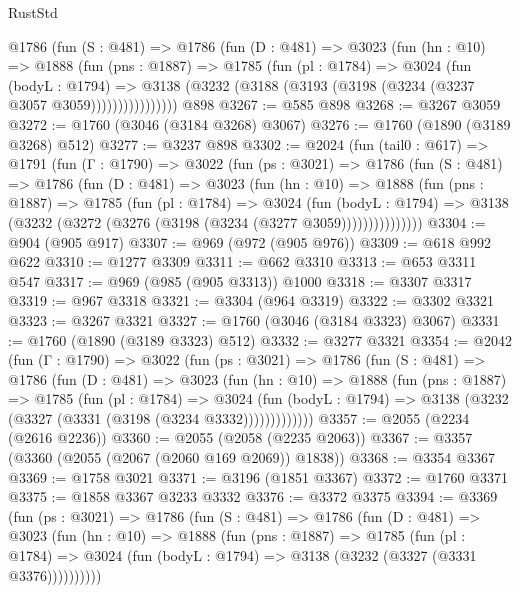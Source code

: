 \begin{lexlean}{RustStd}
\begin{coremodule}
          @1786
            (fun (S : @481) =>
            @1786
              (fun (D : @481) =>
              @3023
                (fun (hn : @10) =>
                @1888
                  (fun (pns : @1887) =>
                  @1785
                    (fun (pl : @1784) =>
                    @3024
                      (fun (bodyL : @1794) =>
                      @3138 (@3232 (@3188 (@3193 (@3198 (@3234 (@3237 @3057 @3059))))))))))))))))
    @898
@3267 := @585 @898
@3268 := @3267 @3059
@3272 := @1760 (@3046 (@3184 @3268) @3067)
@3276 := @1760 (@1890 (@3189 @3268) @512)
@3277 := @3237 @898
@3302 := @2024
    (fun (tail0 : @617) =>
    @1791
      (fun (Γ : @1790) =>
      @3022
        (fun (ps : @3021) =>
        @1786
          (fun (S : @481) =>
          @1786
            (fun (D : @481) =>
            @3023
              (fun (hn : @10) =>
              @1888
                (fun (pns : @1887) =>
                @1785
                  (fun (pl : @1784) =>
                  @3024
                    (fun (bodyL : @1794) =>
                    @3138 (@3232 (@3272 (@3276 (@3198 (@3234 (@3277 @3059)))))))))))))))
@3304 := @904 (@905 @917)
@3307 := @969 (@972 (@905 @976))
@3309 := @618 @992 @622
@3310 := @1277 @3309
@3311 := @662 @3310
@3313 := @653 @3311 @547
@3317 := @969 (@985 (@905 @3313)) @1000
@3318 := @3307 @3317
@3319 := @967 @3318
@3321 := @3304 (@964 @3319)
@3322 := @3302 @3321
@3323 := @3267 @3321
@3327 := @1760 (@3046 (@3184 @3323) @3067)
@3331 := @1760 (@1890 (@3189 @3323) @512)
@3332 := @3277 @3321
@3354 := @2042
    (fun (Γ : @1790) =>
    @3022
      (fun (ps : @3021) =>
      @1786
        (fun (S : @481) =>
        @1786
          (fun (D : @481) =>
          @3023
            (fun (hn : @10) =>
            @1888
              (fun (pns : @1887) =>
              @1785
                (fun (pl : @1784) =>
                @3024
                  (fun (bodyL : @1794) =>
                  @3138 (@3232 (@3327 (@3331 (@3198 (@3234 @3332)))))))))))))
@3357 := @2055 (@2234 (@2616 @2236))
@3360 := @2055 (@2058 (@2235 @2063))
@3367 := @3357 (@3360 (@2055 (@2067 (@2060 @169 @2069)) @1838))
@3368 := @3354 @3367
@3369 := @1758 @3021
@3371 := @3196 (@1851 @3367)
@3372 := @1760 @3371
@3375 := @1858 @3367 @3233 @3332
@3376 := @3372 @3375
@3394 := @3369
    (fun (ps : @3021) =>
    @1786
      (fun (S : @481) =>
      @1786
        (fun (D : @481) =>
        @3023
          (fun (hn : @10) =>
          @1888
            (fun (pns : @1887) =>
            @1785
              (fun (pl : @1784) =>
              @3024 (fun (bodyL : @1794) => @3138 (@3232 (@3327 (@3331 @3376))))))))))

\end{coremodule}
\end{lexlean}
